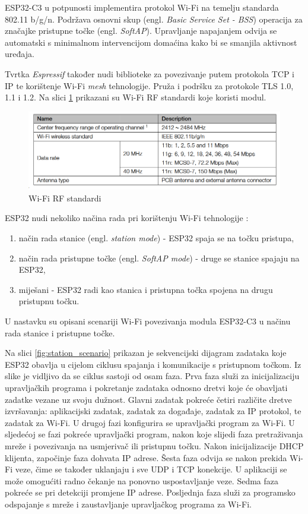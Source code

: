 ESP32-C3 u potpunosti implementira protokol Wi-Fi na temelju standarda 802.11 b/g/n. Podržava osnovni skup (engl. \textit{Basic Service Set - BSS}) operacija za značajke pristupne točke (engl. \textit{SoftAP}). Upravljanje napajanjem odvija se automatski s minimalnom intervencijom domaćina kako bi se smanjila aktivnost uređaja.

Tvrtka \textit{Espressif} također nudi biblioteke za povezivanje putem protokola TCP i IP te korištenje Wi-Fi \textit{mesh} tehnologije. Pruža i podršku za protokole TLS 1.0, 1.1 i 1.2. Na slici \ref{fig:wifi_rf_table} prikazani su Wi-Fi RF standardi koje koristi modul. 

\begin{figure}[ht]
	\centering
	\includegraphics[scale=0.5]{imgs/wifi_rf_table}
	\caption{Wi-Fi RF standardi \cite{esp_mini}}
	\label{fig:wifi_rf_table}
\end{figure}

ESP32 nudi nekoliko načina rada pri korištenju Wi-Fi tehnologije \cite{esp_wifi_connect_overview}:
\begin{enumerate}
	\item način rada stanice (engl. \textit{station mode}) - ESP32 spaja se na točku pristupa,
	\item način rada pristupne točke (engl. \textit{SoftAP mode}) - druge se stanice spajaju na ESP32,
	\item miješani - ESP32 radi kao stanica i pristupna točka spojena na drugu pristupnu točku. 
\end{enumerate}

U nastavku su opisani scenariji Wi-Fi povezivanja modula ESP32-C3 u načinu rada stanice i pristupne točke.

Na slici \ref{fig:station_scenario} prikazan je sekvencijski dijagram zadataka koje ESP32 obavlja u cijelom ciklusu spajanja i komunikacije s pristupnom točkom. Iz slike je vidljivo da se ciklus sastoji od osam faza. Prva faza služi za inicijalizaciju upravljačkih programa i pokretanje zadataka odnosno dretvi koje će obavljati zadatke vezane uz svoju dužnost. Glavni zadatak pokreće četiri različite dretve izvršavanja: aplikacijski zadatak, zadatak za događaje, zadatak za IP protokol, te zadatak za Wi-Fi. U drugoj fazi konfigurira se upravljački program za Wi-Fi. U sljedećoj se fazi pokreće upravljački program, nakon koje slijedi faza pretraživanja mreže i povezivanja na usmjerivač ili pristupnu točku. Nakon inicijalizacije DHCP klijenta, započinje faza dohvata IP adrese. Šesta faza odvija se nakon prekida Wi-Fi veze, čime se također uklanjaju i sve UDP i TCP konekcije. U aplikaciji se može omogućiti radno čekanje na ponovno uspostavljanje veze. Sedma faza pokreće se pri detekciji promjene IP adrese. Posljednja faza služi za programsko odspajanje s mreže i zaustavljanje upravljačkog programa za Wi-Fi.

